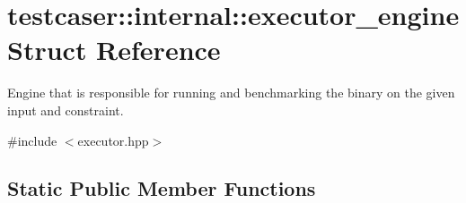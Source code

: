 \hypertarget{structtestcaser_1_1internal_1_1executor__engine}{}\section{testcaser\+::internal\+::executor\+\_\+engine Struct Reference}
\label{structtestcaser_1_1internal_1_1executor__engine}


Engine that is responsible for running and benchmarking the binary on the given input and constraint.  




{\ttfamily \#include $<$executor.\+hpp$>$}

\subsection*{Static Public Member Functions}
